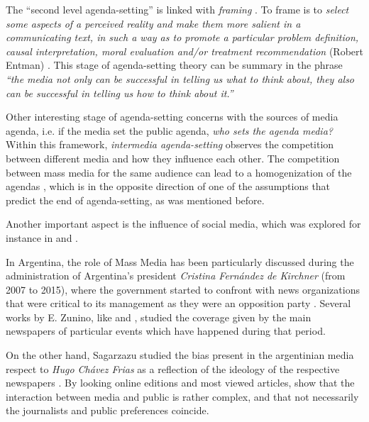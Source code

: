 \par The ``second level agenda-setting'' is linked with \textit{framing} \cite{guggenheim2015dynamics} \cite{tsur2015frame}. 
To frame is to \textit{select some aspects of a perceived reality and make them more salient in a communicating text, in such a way as to promote a particular problem definition, causal interpretation, moral evaluation and/or treatment recommendation} (Robert Entman) \cite{mccombs2005look}.
This stage of agenda-setting theory can be summary in the phrase \textit{``the media not only can be successful in telling us what to think about, they also can be successful in telling us how to think about it.''} 

\par Other interesting stage of agenda-setting concerns with the sources of media agenda, i.e. if the media set the public agenda, \textit{who sets the agenda media?} 
Within this framework, \textit{intermedia agenda-setting} observes the competition between different media and how they influence each other.
The competition between mass media for the same audience can lead to a homogenization of the agendas \cite{vargo2017networks}, which is in the opposite direction of one of the assumptions that predict the end of agenda-setting, as was mentioned before.

Another important aspect is the influence of social media, which was explored for instance in \cite{harder2017intermedia} and \cite{russell2014dynamics}.

\par In Argentina, the role of Mass Media has been particularly discussed during the administration of Argentina’s president \emph{Cristina Fernández de Kirchner} (from 2007 to 2015), where the government started to confront with news organizations that were critical to its management as they were an opposition party \cite{mitchelstein2017information}. Several works by E. Zunino, like \cite{zunino2010cobertura} and \cite{koziner2013cobertura}, studied the coverage given by the main newspapers of particular events which have happened during that period. 
\par On the other hand, Sagarzazu studied the bias present in the argentinian media respect to \emph{Hugo Chávez Frias} as a reflection of the ideology of the respective newspapers  \cite{sagarzazu2017hugo}. By looking online editions and most viewed articles, \cite{mitchelstein2016brecha} show that the interaction between media and public is rather complex, and that not necessarily the journalists and public preferences coincide.

